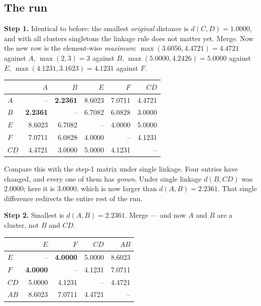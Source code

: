\documentclass[11pt]{article}
\begin{document}
\subsection{The run}

\begin{worked}
\textbf{Step 1.} Identical to before: the smallest \emph{original} distance is
$d(C,D) = 1.0000$, and with all clusters singletons the linkage rule does not
matter yet. Merge. Now the new row is the element-wise \emph{maximum}:
$\max(3.6056, 4.4721) = 4.4721$ against $A$, $\max(2,3) = 3$ against $B$,
$\max(5.0000, 4.2426) = 5.0000$ against $E$, $\max(4.1231, 3.1623) = 4.1231$
against $F$.
\begin{center}\small
\begin{tabular}{lrrrrr}
  \toprule
  & $A$ & $B$ & $E$ & $F$ & $CD$ \\
  \midrule
  $A$  & --     & \textbf{2.2361} & 8.6023 & 7.0711 & 4.4721 \\
  $B$  & \textbf{2.2361} & --     & 6.7082 & 6.0828 & 3.0000 \\
  $E$  & 8.6023 & 6.7082 & --     & 4.0000 & 5.0000 \\
  $F$  & 7.0711 & 6.0828 & 4.0000 & --     & 4.1231 \\
  $CD$ & 4.4721 & 3.0000 & 5.0000 & 4.1231 & -- \\
  \bottomrule
\end{tabular}
\end{center}
Compare this with the step-1 matrix under single linkage. Four entries have
changed, and every one of them has \emph{grown}. Under single linkage
$d(B, CD)$ was $2.0000$; here it is $3.0000$, which is now larger than
$d(A,B) = 2.2361$. That single difference redirects the entire rest of the run.

\textbf{Step 2.} Smallest is $d(A,B) = 2.2361$. Merge --- and now $A$ and $B$
are a cluster, not $B$ and $CD$.
\begin{center}\small
\begin{tabular}{lrrrr}
  \toprule
  & $E$ & $F$ & $CD$ & $AB$ \\
  \midrule
  $E$  & --     & \textbf{4.0000} & 5.0000 & 8.6023 \\
  $F$  & \textbf{4.0000} & --     & 4.1231 & 7.0711 \\
  $CD$ & 5.0000 & 4.1231 & --     & 4.4721 \\
  $AB$ & 8.6023 & 7.0711 & 4.4721 & -- \\
  \bottomrule
\end{tabular}
\end{center}


\end{worked}
\end{document}
